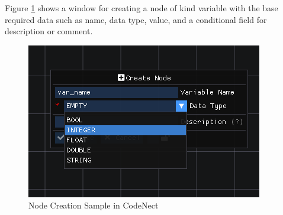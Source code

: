 \parx
Figure \ref{fig:cn_node_create} shows a window for creating a node of kind
variable with the base required data such as name, data type, value, and a
conditional field for description or comment.

\begin{figure}[H]
	\centering
	\captionsetup{justification=centering}
	\captionsetup[figure]{list=yes}
	\includegraphics[width=\linewidth]{media/sc_node_creation_sample.png}
	\caption[Node Creation Sample in CodeNect]{Node Creation Sample in CodeNect}
	\label{fig:cn_node_create}
\end{figure}
